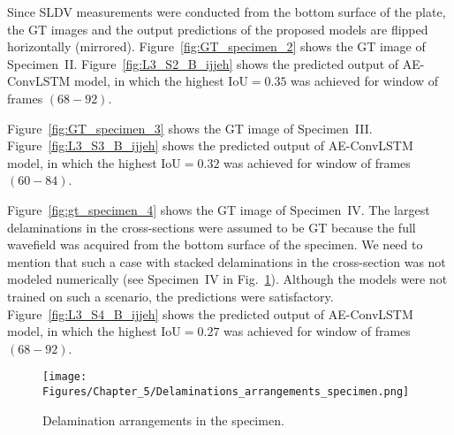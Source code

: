 Since SLDV measurements were conducted from the bottom surface of the plate, the GT images and the output predictions of the proposed models are flipped horizontally (mirrored).
Figure~\ref{fig:GT_specimen_2} shows the GT image of Specimen~II.
Figure~\ref{fig:L3_S2_B_ijjeh} shows the predicted output of AE-ConvLSTM model, in which the highest IoU\(=0.35\) was achieved for window of frames \((68-92)\).

Figure~\ref{fig:GT_specimen_3} shows the GT image of Specimen~III.
Figure~\ref{fig:L3_S3_B_ijjeh} shows the predicted output of AE-ConvLSTM model, in which the highest IoU\(=0.32\) was achieved for window of frames \((60-84)\).

Figure~\ref{fig:gt_specimen_4} shows the GT image of Specimen~IV.
The largest delaminations in the cross-sections were assumed to be GT because the full wavefield was acquired from the bottom surface of the specimen.
We need to mention that such a case with stacked delaminations in the cross-section was not modeled numerically (see Specimen~IV in Fig.~\ref{fig:Delaminations_arrangements_specimen}).
Although the models were not trained on such a scenario, the predictions were satisfactory.
Figure~\ref{fig:L3_S4_B_ijjeh} shows the predicted output of AE-ConvLSTM model, in which the highest IoU\(=0.27\) was achieved for window of frames \((68-92)\).
\begin{figure} [h!]
	\centering
	\texttt{[image: Figures/Chapter\_5/Delaminations\_arrangements\_specimen.png]}
	\caption{Delamination arrangements in the specimen.}
	\label{fig:Delaminations_arrangements_specimen}
\end{figure}
